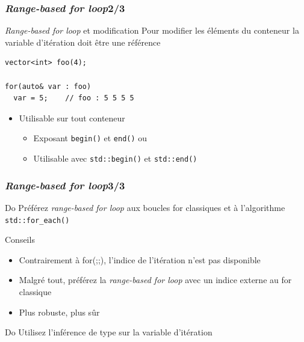 \documentclass[C++.tex]{subfiles}
\begin{document}
\begin{frame}[fragile]
	\frametitle{\textit{Range-based for loop}\titlehfill{}2/3}
	\begin{alertblock}{\textit{Range-based for loop} et modification}
		Pour modifier les éléments du conteneur la variable d'itération doit être une référence
	\end{alertblock}

	\begin{lstlisting}
vector<int> foo(4);

for(auto& var : foo)
  var = 5;    // foo : 5 5 5 5\end{lstlisting}

	\begin{itemize}
		\item Utilisable sur tout conteneur
		\begin{itemize}
			\item Exposant \lstinline|begin()| et \lstinline|end()| ou
			\item Utilisable avec \lstinline|std::begin()| et \lstinline|std::end()|
		\end{itemize}
	\end{itemize}
\end{frame}

\begin{frame}
	\frametitle{\textit{Range-based for loop}\titlehfill{}3/3}
	\begin{exampleblock}{Do}
		Préférez \textit{range-based for loop} aux boucles for classiques et à l'algorithme \lstinline|std::for_each()|
	\end{exampleblock}

	\begin{block}{Conseils}
		\begin{itemize}
			\item Contrairement à for(;;), l'indice de l'itération n'est pas disponible
			\item Malgré tout, préférez la \textit{range-based for loop} avec un indice externe au for classique
			\item Plus robuste, plus sûr

		\end{itemize}
	\end{block}

	\begin{exampleblock}{Do}
		Utilisez l'inférence de type sur la variable d'itération
	\end{exampleblock}
\end{frame}
\end{document}
